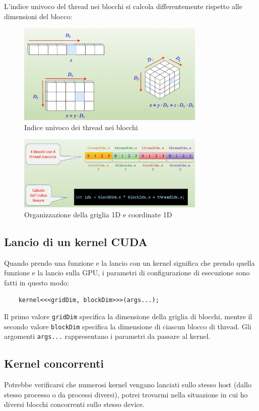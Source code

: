 L'indice univoco del thread nei blocchi si calcola differentemente rispetto alle dimensioni del blocco:

\begin{figure}[ht!]
    \centering
    \includegraphics[width=0.8\textwidth]{images/indiceUnicoBlocchi.png}
    \caption{Indice univoco dei thread nei blocchi}
\end{figure}


\begin{figure}[ht!]
    \centering
    \includegraphics[width=0.8\textwidth]{images/grid1Dcoordinate1D.png}
    \caption{Organizzazione della griglia 1D e coordinate 1D}
\end{figure}

\subsection{Lancio di un kernel CUDA}
Quando prendo una funzione e la lancio con un kernel significa che prendo quella funzione e la lancio sulla GPU, i parametri di configurazione di esecuzione sono fatti in questo modo:
\begin{lstlisting}
    kernel<<<gridDim, blockDim>>>(args...);
\end{lstlisting}
Il primo valore \texttt{gridDim} specifica la dimensione della griglia di blocchi, mentre il secondo valore \texttt{blockDim} specifica la dimensione di ciascun blocco di thread. Gli argomenti \texttt{args...} rappresentano i parametri da passare al kernel.

\subsection{Kernel concorrenti}
Potrebbe verificarsi che numerosi kernel vengano lanciati sullo stesso host (dallo stesso processo o da processi diversi), potrei trovarmi nella situazione in cui ho diversi blocchi concorrenti sullo stesso device.

